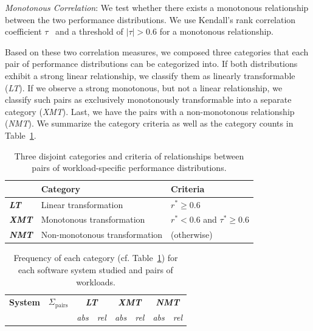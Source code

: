 {\begin{compactenum}
	\item \textit{Monotonous Correlation}: We test whether there exists a monotonous relationship between the two performance distributions. We use Kendall's rank correlation coefficient $\tau$~\cite{kendall1938new} and a threshold of  $\vert\tau\vert > 0.6$ for a monotonous relationship.
\end{compactenum}
{\color{black}Based on these two correlation measures, we composed three categories that each pair of performance distributions can be categorized into.
If both distributions exhibit a strong linear relationship, we classify them as linearly transformable (\textit{\colorbox{lt-color!60}{LT}}). If we observe a strong monotonous, but not a linear relationship, we classify such pairs as exclusively monotonously transformable into a separate category (\textit{\colorbox{xmt-color!60}{XMT}}). Last, we have the pairs with a non-monotonous relationship  (\textit{\colorbox{nmt-color!60}{NMT}}). 
We summarize the category criteria as well as the category counts in Table~\ref{tab:categorization}. 

\begin{table}
	\footnotesize
	\caption{Three disjoint categories and criteria of relationships between pairs of workload-specific performance distributions.}
	\centering
\begin{tabular}{lp{4.1cm}p{2.8cm}}	
	\toprule
	 \textbf{} & \textbf{Category} & \textbf{Criteria}\\
	 \midrule
	 \rowcolor{lt-color!40!white}\cellcolor{lt-color}\textit{\textbf{LT}} & {Linear transformation} & $r^* \geq 0.6$ \\
	\rowcolor{xmt-color!40!white}\cellcolor{xmt-color}\textit{\textbf{XMT}} & {Monotonous transformation} & $r^* < 0.6 $ and $ \tau^* \geq 0.6$ \\
	\rowcolor{nmt-color!40!white}\cellcolor{nmt-color}\textit{\textbf{NMT}} & {Non-monotonous transformation}  & (otherwise) \\%
	\bottomrule
\end{tabular}
\label{tab:categorization}
\end{table}

\begin{table}
	\footnotesize
	\centering
	\caption{Frequency of each category (cf. Table~\ref{tab:categorization}) for each software system studied and pairs of workloads.}
\begin{tabular}{p{1.1cm}rrrrrrr}	
	\toprule
	\textbf{System} & \textbf{$\Sigma_\text{pairs}$} & \multicolumn{2}{c}{\textbf{\cellcolor{lt-color}\textit{LT}}} & \multicolumn{2}{c}{\textbf{\cellcolor{xmt-color}\textit{XMT}}} & \multicolumn{2}{c}{\textbf{\cellcolor{nmt-color}\textit{NMT}}}\\
	  & & \textit{abs} &\textit{rel} & \textit{abs} & \textit{rel}& \textit{abs} & \textit{rel}\\
	\midrule
	

\end{tabular}
\end{table}}}
